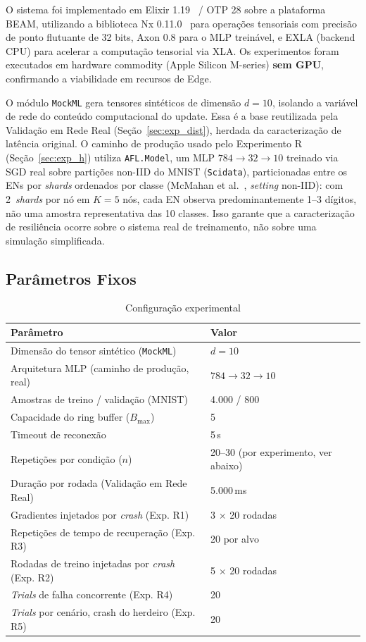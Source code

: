 \documentclass[conference,a4paper]{IEEEtran}
\begin{document}
O sistema foi implementado em Elixir 1.19~\cite{elixir2024} / OTP 28 sobre
a plataforma BEAM, utilizando a biblioteca Nx 0.11.0~\cite{nx2024} para
operações tensoriais com
precisão de ponto flutuante de 32 bits, Axon 0.8 para o MLP treinável, e
EXLA (backend CPU) para acelerar a computação tensorial via XLA. Os
experimentos foram executados em hardware commodity (Apple Silicon
M-series) \textbf{sem GPU}, confirmando a viabilidade em recursos de Edge.

O módulo \texttt{MockML} gera tensores sintéticos de dimensão $d=10$,
isolando a variável de rede do conteúdo computacional do update. Essa é
a base reutilizada pela Validação em Rede Real
(Seção~\ref{sec:exp_dist}), herdada da caracterização de latência
original. O caminho de produção usado pelo Experimento R
(Seção~\ref{sec:exp_h}) utiliza \texttt{AFL.Model}, um MLP
$784\!\to\!32\!\to\!10$ treinado via SGD real sobre partições non-IID do
MNIST (\texttt{Scidata}), particionadas entre os ENs por \textit{shards}
ordenados por classe (McMahan et al.~\cite{mcmahan2017}, \textit{setting}
non-IID): com 2~\textit{shards} por nó em $K=5$ nós, cada EN observa
predominantemente 1--3 dígitos, não uma amostra representativa das 10
classes. Isso garante que a caracterização de resiliência ocorre sobre
o sistema real de treinamento, não sobre uma simulação simplificada.

\subsection{Parâmetros Fixos}

\begin{table}[H]
\centering
\caption{Configuração experimental}
\label{tab:config}
\small
\begin{tabular}{@{}ll@{}}
\toprule
\textbf{Parâmetro} & \textbf{Valor} \\
\midrule
Dimensão do tensor sintético (\texttt{MockML}) & $d=10$ \\
Arquitetura MLP (caminho de produção, real) & $784 \to 32 \to 10$ \\
Amostras de treino / validação (MNIST) & 4.000 / 800 \\
Capacidade do ring buffer ($B_{\max}$) & 5 \\
Timeout de reconexão & 5\,s \\
Repetições por condição ($n$) & 20--30 (por experimento, ver abaixo) \\
Duração por rodada (Validação em Rede Real) & 5.000\,ms \\
Gradientes injetados por \textit{crash} (Exp. R1) & 3 $\times$ 20 rodadas \\
Repetições de tempo de recuperação (Exp. R3) & 20 por alvo \\
Rodadas de treino injetadas por \textit{crash} (Exp. R2) & 5 $\times$ 20 rodadas \\
\textit{Trials} de falha concorrente (Exp. R4) & 20 \\
\textit{Trials} por cenário, crash do herdeiro (Exp. R5) & 20 \\
\bottomrule
\end{tabular}
\end{table}
\end{document}
